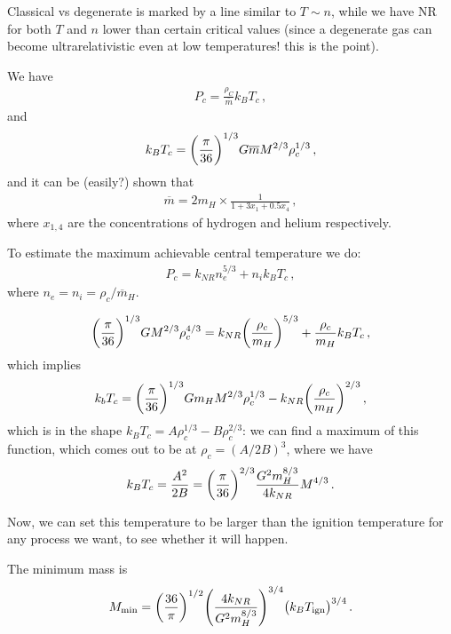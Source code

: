 \documentclass[main.tex]{subfiles}
\begin{document}
Classical vs degenerate is marked by a line similar to \(T \sim n\), while we have NR for both \(T\) and \(n\) lower than certain critical values (since a degenerate gas can become ultrarelativistic even at low temperatures! this is the point).

We have 
%
\begin{align}
  P_c = \frac{\rho _C}{\overline{m}} k_B T_c
\,,
\end{align}
%
and 
%
\begin{align}
  k_B T_c = \qty(\frac{\pi }{36})^{1/3} G \overline{m}
  M^{2/3} \rho _c^{1/3}
\,,
\end{align}
%
and it can be (easily?) shown that 
%
\begin{align}
  \overline{m} = 2 m_H \times \frac{1}{1 + 3x_1 + 0.5 x_4}
\,,
\end{align}
%
where \(x_{1, 4}\) are the concentrations of hydrogen and helium respectively. 

To estimate the maximum achievable central temperature we do: 
%
\begin{align}
  P_c = k_{NR} n_{e}^{5/3} + n_i k_B T_c
\,,
\end{align}
%
where \(n_e = n_i  = \rho_{c} / \overline{m}_{H}\). 


%
\begin{align}
  \qty(\frac{\pi}{36})^{1/3} G M^{2/3} \rho_{c}^{4/3}
  = k_{NR} \qty(\frac{\rho_c}{m_{H}})^{5/3} + \frac{\rho_{c}}{m_H} k_B T_c
\,,
\end{align}
%
which implies 
%
\begin{align}
  k_b T_c = \qty(\frac{\pi}{36})^{1/3} G m_{H} M^{2/3} \rho_{c}^{1/3} - k_{NR} \qty(\frac{\rho_{c}}{m_H})^{2/3}
\,,
\end{align}
%
which is in the shape \(k_B T_c = A \rho_{c}^{1/3} - B \rho_{c}^{2/3}  \): we can find a maximum of this function, which comes out to be at \(\rho_{c} = (A/ 2B)^{3}\), where we have 
%
\begin{align}
  k_B T_c = \frac{A^2}{2B} = \qty(\frac{\pi }{36})^{2/3} \frac{G^2m_H^{8/3}}{4 k_{NR}} M^{4/3}
\,.
\end{align}

Now, we can set this temperature to be larger than the ignition temperature for any process we want, to see whether it will happen. 

The minimum mass is 
%
\begin{align}
  M _{\text{min}} = 
  \qty(\frac{36}{\pi })^{1/2} 
  \qty(\frac{4 k_{NR}}{G^2m_H^{8/3}})^{3/4}
  \qty(k_B T _{\text{ign}})^{3/4}
\,.
\end{align}
\end{document}
